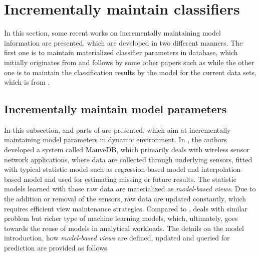 \section{Incrementally maintain classifiers}
In this section, some recent works on incrementally maintaining model information are presented, which are developed in two different manners. The first one is to maintain materialized classifier parameters in database, which initially originates from \cite{deshpande2006mauvedb} and follows by some other papers such as \cite{gupta2015processing} while the other one is to maintain the classification results by the model for the current data sets, which is from \cite{koc2011incrementally}.


\subsection{Incrementally maintain model parameters}
In this subsection, \cite{deshpande2006mauvedb} and parts of \cite{gupta2015processing} are presented, which aim at incrementally maintaining model parameters in dynamic environment. In \cite{deshpande2006mauvedb}, the authors developed a system called MauveDB, which primarily deals with wireless sensor network applications, where data are collected through underlying sensors, fitted with typical statistic model such as regression-based model and interpolation-based model and used for estimating missing or future results. The statistic models learned with those raw data are materialized as {\em model-based views}.
Due to the addition or removal of the sensors, raw data are updated constantly, which requires efficient view maintenance strategies. Compared to \cite{deshpande2006mauvedb}, \cite{gupta2015processing} deals with similar problem but richer type of machine learning models, which, ultimately, goes towards the reuse of models in analytical workloads. The details on the model introduction, how {\em model-based views} are defined, updated and queried for prediction are provided as follows.

